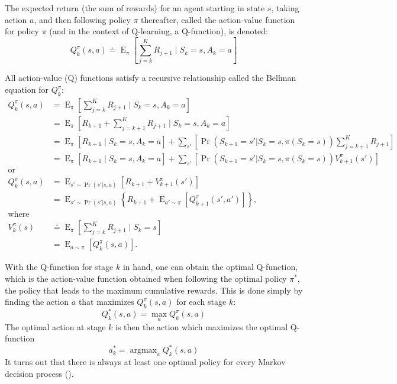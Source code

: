 \documentclass[12pt]{article}
\DeclareMathOperator*{\argmax}{argmax}
\begin{document}
The expected return (the sum of rewards) for an agent starting in state $s$, taking action $a$, and then following policy $\pi$ thereafter, called the action-value function for policy \( \pi \) (and in the context of Q-learning, a Q-function), is denoted:
\begin{equation}
  Q^{\pi}_{k}(s,a) \doteq
    \operatorname{E}_{\pi}\left[
      \sum_{j=k}^{K} R_{j+1} \mid S_{k} = s, A_{k} = a
    \right]
\end{equation}

All action-value (Q) functions satisfy a recursive relationship called the Bellman equation for $Q_{k}^{\pi}$:
\begin{align}
  Q_{k}^{\pi}(s,a) &=
  \operatorname{E}_{\pi}\left[
      \sum_{j=k}^{K} R_{j+1} \mid S_{k} = s, A_{k} = a\right] \nonumber\\
     &=
    \operatorname{E}_{\pi}\left[
     R_{k+1}+ \sum_{j=k+1}^{K} R_{j+1} \mid S_{k} = s, A_{k} = a \right]\nonumber\\
     &=
     \operatorname{E}_{\pi}\left[R_{k+1}\mid S_{k} = s, A_{k} = a\right]+  \sum_{s'}\left[ \Pr(S_{k+1} = s'|S_{k} = s, \pi(S_{k} = s))\sum_{j=k+1}^{K} R_{j+1}\right]\nonumber\\
     &=
     \operatorname{E}_{\pi}\left[R_{k+1}\mid S_{k} = s, A_{k} = a\right]+  \sum_{s'}\left[ \Pr(S_{k+1} = s'|S_{k} = s, \pi(S_{k} = s))V_{k+1}^{\pi}(s')\right]\nonumber\\
     \mbox{or}\nonumber\\
 Q_{k}^{\pi}(s,a)    &=
     \operatorname{E}_{s'\sim\Pr(s'|s,a)}\left[R_{k+1}+   V_{k+1}^{\pi}(s') \right]\nonumber\\
     &=
       \operatorname{E}_{s'\sim\Pr(s'|s,a)}\left\{ R_{k+1}+\operatorname{E}_{a'\sim \pi} [Q_{k+1}^{\pi}(s',a')] \right\}\label{eq:q_pi_dp_operator}, \\
\text{where } \nonumber \\
  V_{k}^{\pi}(s) &\doteq
    \operatorname{E}_{\pi}\left[
      \sum_{j=k}^{K} R_{j+1} \mid S_{k} = s
    \right] \\
    &= \operatorname{E}_{a\sim\pi} \left[ Q_{k}^{\pi}(s,a)  \right].
\end{align}

With the Q-function for stage \( k \) in hand, one can obtain the optimal Q-function, which is the action-value function obtained when following the optimal policy  \( \pi^{*} \), the policy that leads to the maximum cumulative rewards. This is done simply by finding the action \( a \) that maximizes \( Q^{\pi}_{k}(s,a) \) for each stage \( k \):
\begin{equation}
   Q^{*}_{k}(s, a) = \max_{a} Q^{\pi}_{k}(s, a)
\end{equation}
The optimal action at stage \( k \) is then the action which maximizes the optimal Q-function
\begin{equation}
  a^{*}_{k} = \argmax_{a} Q^{*}_{k}(s, a)
\end{equation}
It turns out that there is always at least one optimal policy for every Markov decision process (\cite{Sutton2016}).
\end{document}
